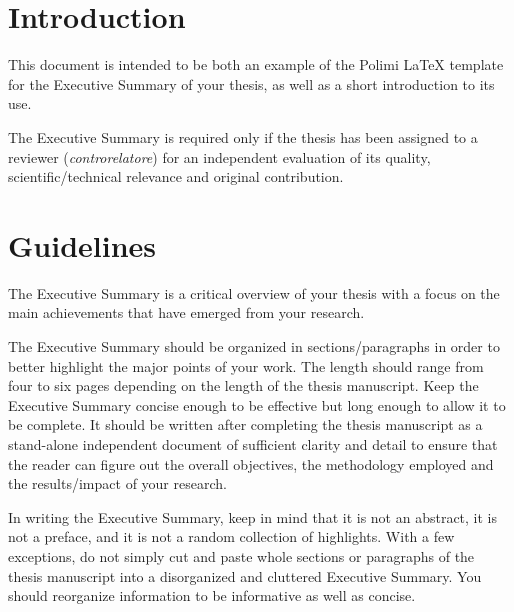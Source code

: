 \documentclass[11pt,a4paper,twocolumn]{article}
\begin{document}
\newpage



\section{Introduction}
\label{sec:introduction}

This document is intended to be both an example of the Polimi \LaTeX{} template for the Executive Summary
of your thesis, as well as a short introduction to its use.

The Executive Summary is required only
if the thesis has been assigned to a reviewer (\textit{controrelatore})
for an independent evaluation of its quality, scientific/technical relevance and original contribution.

\section{Guidelines}
\label{sec:guidelines}

The Executive Summary is a critical overview of your thesis
with a focus on the main achievements that have emerged from your research.

The Executive Summary should be organized in sections/paragraphs
in order to better highlight the major points of your work.
The length should range from four to six pages depending on the length of the thesis manuscript.
Keep the Executive Summary concise enough to be effective but long enough to allow it to be complete.
It should be written after completing the thesis manuscript as a stand-alone independent document
of sufficient clarity and detail to ensure that the reader can figure out the overall objectives,
the methodology employed and the results/impact of your research.

In writing the Executive Summary, keep in mind that it is not an abstract, it is not a preface,
and it is not a random collection of highlights.
With a few exceptions, do not simply cut and paste whole sections or paragraphs of the thesis manuscript
into a disorganized and cluttered Executive Summary.
You should reorganize information to be informative as well as concise.
\end{document}
